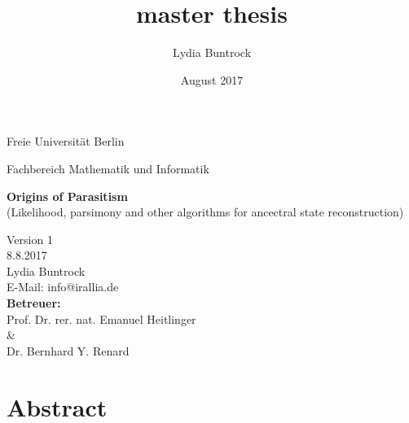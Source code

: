
\author{Lydia Buntrock}
\title{master thesis}
\date{August 2017}


  \begin{titlepage}
    \pagestyle{empty}
  	\begin{center}
      {\Large Freie Universität Berlin}\\
    	\begin{Huge}
      	Fachbereich Mathematik und Informatik\\
      	\vspace{3mm}
    	\end{Huge}
    	\vspace{20mm}
    	\begin{Large}
    	    \textbf{Origins of Parasitism}\\
          (Likelihood, parsimony and other algorithms for ancectral state reconstruction)\\
    	\end{Large}
    	\vspace{8mm}
      Version 1\\
      8.8.2017\\
    	\vspace{2cm}
    	Lydia Buntrock \\
      E-Mail: info@irallia.de\\
     	\vspace{5cm}
    	\textbf{Betreuer:}\\
      Prof. Dr. rer. nat. Emanuel Heitlinger\\
      \& \\
      Dr. Bernhard Y. Renard\\
  	\end{center}
  	\clearpage
  \end{titlepage}

\chapter*{Abstract}


